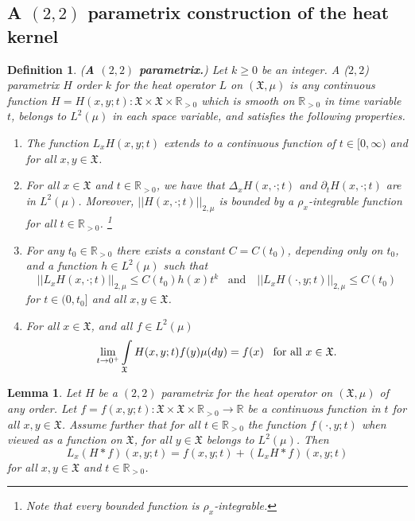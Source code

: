 \documentclass[11pt,reqno]{amsart}
\newtheorem{lemma}[theorem]{Lemma}
\newtheorem{definition}[theorem]{Definition}
\theoremstyle{remark}
\theoremstyle{definition}
\numberwithin{theorem}{section} \numberwithin{equation}{section}
\newcommand{\X}{\mathfrak{X}}
\begin{document}
\subsection{A $(2,2)$ parametrix construction of the heat kernel}

\begin{definition}\label{def. parametrix2} (\textbf{A $(2,2)$ parametrix.})
Let $k\geq 0$ be an integer. A \emph{($2,2$) parametrix} $H$ order $k$  for the heat operator $L$ on $(\X,\mu)$
is any continuous function $H=H(x,y;t):\X\times \X\times \mathbb{R}_{>0}$
which is smooth on $\mathbb{R}_{>0}$ in time variable $t$, belongs to $L^2(\mu)$ in each space variable, and satisfies the following properties.
\begin{enumerate}
\item The function $L_{x}H(x,y;t)$ extends to a continuous function of $t \in [0,\infty)$ and for all $x,y\in\X$.

 \item  For all  $x\in \X$ and $t\in \mathbb{R}_{>0}$, we have that $\Delta_{x}H(x,\cdot;t)$ and $\partial_t  H(x,\cdot;t)$
 are in $L^2(\mu)$. Moreover, $||H(x,\cdot;t)||_{2,\mu} $ is bounded by a $\rho_x$-integrable function for all $t\in \mathbb{R}_{>0}$.
 \footnote{Note that every bounded function is $\rho_x$-integrable.}
\item For any $t_0\in \mathbb{R}_{>0}$ there exists a constant $C=C(t_0)$, depending only on
$t_0$, and a function $h\in L^2(\mu)$ such that
$$
||L_{x}H(x,\cdot;t)||_{2,\mu} \leq C(t_0)h(x)t^k
\,\,\,\,\,
\text{and}\quad ||L_{x}H(\cdot,y;t)||_{2,\mu} \leq C(t_0)
$$
for $t \in (0, t_0]$ and all $x,y\in \X$.
\item For all $x\in \X$, and all $f\in L^2(\mu)$
\begin{equation}\label{eq:dirac property of heat kernel2}
\lim\limits_{t \rightarrow 0^+}\int\limits_{\X}H(x,y;t)f(y)\mu(dy)=f(x)
\,\,\,\,\,
\text{\rm for all $x\in\X$.}
\end{equation}
\end{enumerate}
\end{definition}

\begin{lemma}
\label{lem: L of convol}
Let $H$ be a $(2,2)$ parametrix for the heat operator on $(\X,\mu)$ of any order.
Let $f=f(x,y;t):\X\times \X\times\mathbb{R}_{> 0}\to\mathbb{R}$
be a continuous function in $t$ for all $x,y\in \X$. Assume further that for all $t\in \mathbb{R}_{> 0}$ the function
$f(\cdot,y;t)$ when viewed as a function on $\X$, for all $y\in\X$ belongs to $L^2(\mu)$.  Then
$$
L_{x}( H\ast f)(x,y;t)=f(x,y;t)+(L_{x}H \ast f)(x,y;t)
$$
for all $x,y\in \X$ and $t\in\mathbb{R}_{>0}$.
\end{lemma}
\end{document}
